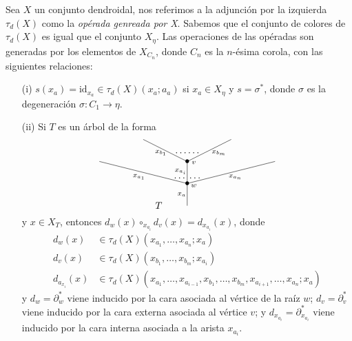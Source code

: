 \documentclass[../main.tex]{subfiles}
\begin{document}
Sea $X$ un conjunto dendroidal, nos referimos a la adjunci\'on por la izquierda $\tau_d(X)$ como la \emph{op\'erada genreada por X}.
Sabemos que el conjunto de colores de $\tau_d(X)$ es igual que el conjunto $X_\eta$. Las operaciones de las op\'eradas son generadas por los elementos de $X_{C_n}$, donde $C_n$ es la $n$-\'esima corola, con las siguientes relaciones:
\begin{enumerate}
    \item[{\rm (i)}] $s(x_a) = \text{id}_{x_a} \in \tau_d(X)(x_a;a_a)$ si $x_a\in X_\eta$ y $s=\sigma^{*}$, donde $\sigma$ es la degeneraci\'on $\sigma\colon C_1 \to\eta$.
    \item[{\rm (ii)}] Si $T$ es un \'arbol de la forma
          \begin{equation}
              \xy
              <0.08cm, 0cm>:
              (0.0, 0.0)*{}="1"; %
              (0.0, 10.0)*=0{\bullet}="2"; %
              (-40.0, 20.0)*{}="3"; %
              (0.0, 20.0)*=0{\bullet}="4"; %
              (-20.0, 30.0)*{}="5"; %
              (20.0, 30.0)*{}="6"; %
              (40.0, 20.0)*{}="7"; %
              "1";"2" **\dir{-};
              "2";"3" **\dir{-};
              "2";"4" **\dir{-};
              "4";"5" **\dir{-};
              "4";"6" **\dir{-};
              "2";"7" **\dir{-};
              (3.0, 9.0)*=0{\scriptstyle w};
              (3.0, 19.5)*=0{\scriptstyle v};
              (-2.5, 5.0)*=0{\scriptstyle x_a};
              (-22.0, 13.0)*=0{\scriptstyle x_{a_1}};
              (-3.0, 15.5)*=0{\scriptstyle x_{a_i}};
              (-12.0, 24.0)*=0{\scriptstyle x_{b_1}};
              (14.5, 24.0)*=0{\scriptstyle x_{b_m}};
              (22.0, 13.0)*=0{\scriptstyle x_{a_n}};
              (0,24)*{\dots\dots};
              (-3.5,12.5)*{\dots};
              (3.5,12.5)*{\dots};
              (-13,0)*{T};
              \endxy
          \end{equation}
          y $x\in X_T$, entonces $d_w(x)\circ_{x_{a_i}}d_v(x)=d_{x_{a_i}}(x)$, donde
          \begin{align*}
              d_w(x)         & \in \tau_d(X)(x_{a_1},\dots,x_{a_n};x_a)                                                     \\
              d_v(x)         & \in \tau_d(X)(x_{b_1},\dots,x_{b_m};x_{a_i})                                                 \\
              d_{a_{x_i}}(x) & \in \tau_d(X)(x_{a_1},\dots,x_{a_{i-1}},x_{b_1},\dots,x_{b_m},x_{a_{i+1}},\dots,x_{a_n};x_a)
          \end{align*}
          y $d_w = \partial_w^{*}$ viene inducido por la cara asociada al v\'ertice de la ra\'iz $w$; $d_v = \partial_v^{*}$ viene inducido por la cara externa asociada al v\'ertice $v$; y $d_{x_{a_i}}= \partial_{x_{a_i}}^{*}$ viene inducido por la cara interna asociada a la arista $x_{a_i}$.
\end{enumerate}
\end{document}
